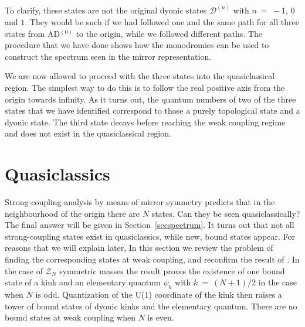\documentclass[epsfig,12pt]{article}
\newcommand{\mc}[1]{\mathcal{#1}}
\newcommand{\D}{\mathcal{D}}
\begin{document}
	To clarify, these states are not the original dyonic states $ \D^{(n)} $ with $ n ~=~ -1 $,
	$ 0 $ and $ 1 $.
	They would be such if we had followed one and the same path for all three states from AD$^{(0)}$ to
	the origin, while we followed different paths.
	The procedure that we have done shows how the monodromies can be used to construct the spectrum
	seen in the mirror representation.

	We are now allowed to proceed with the three states into the quasiclassical region.
	The simplest way to do this is to follow the real positive axis from the origin towards infinity.
	As it turns out, the quantum numbers of two of the three states that we have identified correspond to those
	a purely topological state and a dyonic state.
	The third state decays before reaching the weak coupling regime and 
	does not exist in the quasiclassical region.



\newpage
\section{Quasiclassics}
\label{qclassics}
\setcounter{equation}{0}

	Strong-coupling analysis by means of mirror symmetry predicts that in the neighbourhood of the origin
	there are $ N $ states.
	Can they be seen quasiclassically?
	The final answer will be given in Section~\ref{secspectrum}.
	It turns out that not all strong-coupling states exist in quasiclassics, while new, bound states appear.
	For reasons that we will explain later, 
	In this section we review the problem of finding the corresponding states at weak coupling, and 
	reconfirm the result of 
\cite{Dorey:1998yh}.
	In the case of $ \mc{Z}_N $ symmetric masses the result proves the existence of one bound state of a kink
	and an elementary quantum $ \psi_k $ with $ k ~=~ (N+1)/2 $ in the case when $ N $ is odd.
	Quantization of the U(1) coordinate of the kink then raises a tower of bound states of dyonic kinks
	and the elementary quantum.
	There are no bound states at weak coupling when $ N $ is even.
\end{document}
